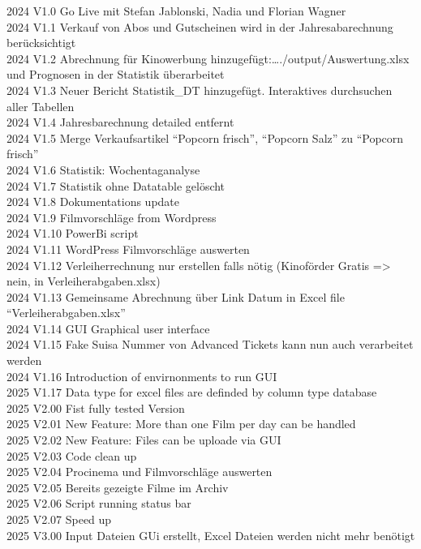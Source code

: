 \documentclass[
]{article}
\begin{document}
2024 V1.0 Go Live mit Stefan Jablonski, Nadia und Florian Wagner\\
2024 V1.1 Verkauf von Abos und Gutscheinen wird in der Jahresabarechnung
berücksichtigt\\
2024 V1.2 Abrechnung für Kinowerbung
hinzugefügt:\ldots./output/Auswertung.xlsx und Prognosen in der
Statistik überarbeitet\\
2024 V1.3 Neuer Bericht Statistik\_DT hinzugefügt. Interaktives
durchsuchen aller Tabellen\\
2024 V1.4 Jahresbarechnung detailed entfernt\\
2024 V1.5 Merge Verkaufsartikel ``Popcorn frisch'', ``Popcorn Salz'' zu
``Popcorn frisch''\\
2024 V1.6 Statistik: Wochentaganalyse\\
2024 V1.7 Statistik ohne Datatable gelöscht\\
2024 V1.8 Dokumentations update\\
2024 V1.9 Filmvorschläge from Wordpress\\
2024 V1.10 PowerBi script\\
2024 V1.11 WordPress Filmvorschläge auswerten\\
2024 V1.12 Verleiherrechnung nur erstellen falls nötig (Kinoförder
Gratis =\textgreater{} nein, in Verleiherabgaben.xlsx)\\
2024 V1.13 Gemeinsame Abrechnung über Link Datum in Excel file
``Verleiherabgaben.xlsx''\\
2024 V1.14 GUI Graphical user interface\\
2024 V1.15 Fake Suisa Nummer von Advanced Tickets kann nun auch
verarbeitet werden\\
2024 V1.16 Introduction of envirnonments to run GUI\\
2025 V1.17 Data type for excel files are definded by column type
database\\
2025 V2.00 Fist fully tested Version\\
2025 V2.01 New Feature: More than one Film per day can be handled\\
2025 V2.02 New Feature: Files can be uploade via GUI\\
2025 V2.03 Code clean up\\
2025 V2.04 Procinema und Filmvorschläge auswerten\\
2025 V2.05 Bereits gezeigte Filme im Archiv\\
2025 V2.06 Script running status bar\\
2025 V2.07 Speed up\\
2025 V3.00 Input Dateien GUi erstellt, Excel Dateien werden nicht mehr
benötigt
\end{document}
